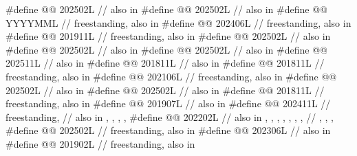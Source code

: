 \begin{codeblock}
#define @@                    202502L // also in 
#define @@                     202502L // also in 
#define @@                  YYYYMML // freestanding, also in 
#define @@                     202406L // freestanding, also in 
#define @@                 201911L // freestanding, also in 
#define @@                   202502L // also in 
#define @@                     202502L // also in 
#define @@                   202502L // also in 
#define @@                  202511L // also in 
#define @@             201811L // also in 
#define @@                   201811L // freestanding, also in 
#define @@                202106L // freestanding, also in 
#define @@           202502L // also in 
#define @@           202502L // also in 
#define @@                 201811L // freestanding, also in 
#define @@                  201907L // also in 
#define @@              202411L // freestanding,
  // also in , , , , 
#define @@                 202202L
  // also in , , , , , , ,
  // , , , 
#define @@                         202502L // freestanding, also in 
#define @@                 202306L // also in 
#define @@                         201902L // freestanding, also in 

\end{codeblock}
